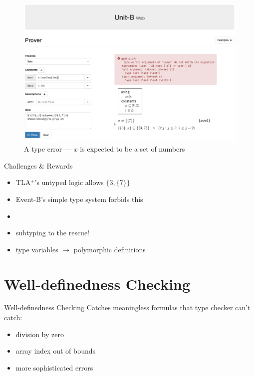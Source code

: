\documentclass[11pt]{beamer}
\newcommand{\eventb}{Event-B\xspace}
\newcommand{\tla}{TLA${}^+$\xspace}
\begin{document}
\begin{frame}[plain]
  \begin{figure}
    \centering
    \includegraphics[width=\textwidth]{img/unitb_typechecking.png}
    \caption{A type error --- $x$ is expected to be a set of
      numbers}\label{fig:typechecking}
  \end{figure}
\end{frame}


\begin{frame}[fragile]{Challenges \& Rewards}
  \begin{itemize}[<+->]
  \item \tla's untyped logic allows $\{3, \{7\}\}$
  \item \eventb's simple type system forbids this
  \item {}
  \item \alert{\large subtyping} to the rescue!
  \item type variables $\rightarrow$ polymorphic definitions
  \end{itemize}
\end{frame}


\section{Well-definedness Checking}

\begin{frame}[fragile]{Well-definedness Checking}
  Catches meaningless formulas that type checker can't catch:
  \begin{itemize}
  \item <2-> division by zero
  \item <3-> array index out of bounds
  \item <4-> more sophisticated errors
  \end{itemize}
\end{frame}
\end{document}
